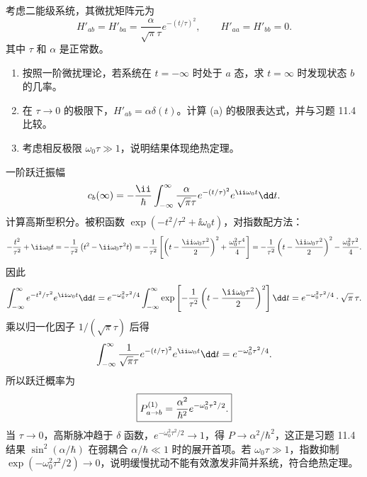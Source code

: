 \begin{question}
考虑二能级系统，其微扰矩阵元为
\[
H'_{ab}=H'_{ba}=\frac{\alpha}{\sqrt{\pi}\tau}e^{-(t/\tau)^2},\qquad H'_{aa}=H'_{bb}=0.
\]
其中 $\tau$ 和 $\alpha$ 是正常数。
\begin{enumerate}
\item 按照一阶微扰理论，若系统在 $t=-\infty$ 时处于 $a$ 态，求 $t=\infty$ 时发现状态 $b$ 的几率。
\item 在 $\tau\to0$ 的极限下，$H'_{ab}=\alpha\delta(t)$。计算 (a) 的极限表达式，并与习题 11.4 比较。
\item 考虑相反极限 $\omega_0\tau\gg1$，说明结果体现绝热定理。
\end{enumerate}
\end{question}
\begin{solution}
一阶跃迁振幅
\[
c_b(\infty)=-{\ii\over\hbar}\int_{-\infty}^{\infty}{\alpha\over\sqrt\pi\tau}e^{-(t/\tau)^2}e^{\ii\omega_0t}\dd t.
\]
计算高斯型积分。被积函数 $\exp(-t^2/\tau^2+\ii\omega_0t)$，对指数配方法：
\[
-{t^2\over\tau^2}+\ii\omega_0t
=-{1\over\tau^2}\left(t^2-\ii\omega_0\tau^2 t\right)
=-{1\over\tau^2}\left[\left(t-{\ii\omega_0\tau^2\over2}\right)^2+{\omega_0^2\tau^4\over4}\right]
=-{1\over\tau^2}\left(t-{\ii\omega_0\tau^2\over2}\right)^2-{\omega_0^2\tau^2\over4}.
\]
因此
\[
\int_{-\infty}^{\infty}e^{-t^2/\tau^2}e^{\ii\omega_0t}\dd t
=e^{-\omega_0^2\tau^2/4}\int_{-\infty}^{\infty}
\exp\left[-{1\over\tau^2}\left(t-{\ii\omega_0\tau^2\over2}\right)^2\right]\dd t
=e^{-\omega_0^2\tau^2/4}\cdot\sqrt\pi\,\tau.
\]
乘以归一化因子 $1/(\sqrt\pi\tau)$ 后得
\[
\int_{-\infty}^{\infty}{1\over\sqrt\pi\tau}e^{-(t/\tau)^2}e^{\ii\omega_0t}\dd t=e^{-\omega_0^2\tau^2/4}.
\]
所以跃迁概率为
\[
\boxed{P_{a\to b}^{(1)}={\alpha^2\over\hbar^2}e^{-\omega_0^2\tau^2/2}.}
\]
当 $\tau\to0$，高斯脉冲趋于 $\delta$ 函数，$e^{-\omega_0^2\tau^2/2}\to1$，得 $P\to\alpha^2/\hbar^2$，这正是习题 11.4 结果 $\sin^2(\alpha/\hbar)$ 在弱耦合 $\alpha/\hbar\ll1$ 时的展开首项。若 $\omega_0\tau\gg1$，指数抑制 $\exp(-\omega_0^2\tau^2/2)\to0$，说明缓慢扰动不能有效激发非简并系统，符合绝热定理。
\end{solution}

